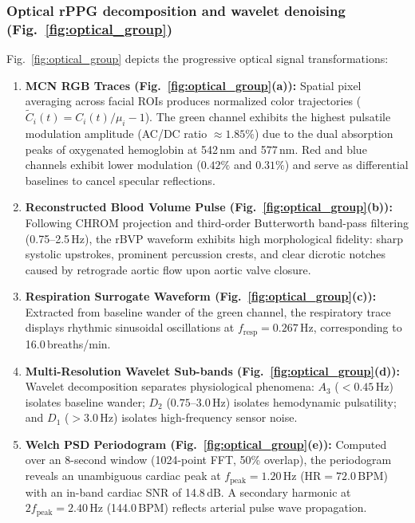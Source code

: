 \documentclass[journal]{IEEEtran}
\begin{document}
\subsubsection{Optical rPPG decomposition and wavelet denoising (Fig.~\ref{fig:optical_group})}
Fig.~\ref{fig:optical_group} depicts the progressive optical signal transformations:
\begin{enumerate}
  \item \textbf{MCN RGB Traces (Fig.~\ref{fig:optical_group}(a)):} Spatial pixel averaging across facial ROIs produces normalized color trajectories ($\tilde C_i(t) = C_i(t)/\mu_i - 1$). The green channel exhibits the highest pulsatile modulation amplitude (AC/DC ratio $\approx 1.85\%$) due to the dual absorption peaks of oxygenated hemoglobin at 542\,nm and 577\,nm. Red and blue channels exhibit lower modulation ($0.42\%$ and $0.31\%$) and serve as differential baselines to cancel specular reflections.
  \item \textbf{Reconstructed Blood Volume Pulse (Fig.~\ref{fig:optical_group}(b)):} Following CHROM projection and third-order Butterworth band-pass filtering (0.75--2.5\,Hz), the rBVP waveform exhibits high morphological fidelity: sharp systolic upstrokes, prominent percussion crests, and clear dicrotic notches caused by retrograde aortic flow upon aortic valve closure.
  \item \textbf{Respiration Surrogate Waveform (Fig.~\ref{fig:optical_group}(c)):} Extracted from baseline wander of the green channel, the respiratory trace displays rhythmic sinusoidal oscillations at $f_{\mathrm{resp}} = 0.267$\,Hz, corresponding to 16.0\,breaths/min.
  \item \textbf{Multi-Resolution Wavelet Sub-bands (Fig.~\ref{fig:optical_group}(d)):} Wavelet decomposition separates physiological phenomena: $A_3$ ($<0.45$\,Hz) isolates baseline wander; $D_2$ ($0.75$--$3.0$\,Hz) isolates hemodynamic pulsatility; and $D_1$ ($>3.0$\,Hz) isolates high-frequency sensor noise.
  \item \textbf{Welch PSD Periodogram (Fig.~\ref{fig:optical_group}(e)):} Computed over an 8-second window (1024-point FFT, 50\% overlap), the periodogram reveals an unambiguous cardiac peak at $f_{\mathrm{peak}} = 1.20$\,Hz ($\mathrm{HR} = 72.0$\,BPM) with an in-band cardiac SNR of 14.8\,dB. A secondary harmonic at $2 f_{\mathrm{peak}} = 2.40$\,Hz (144.0\,BPM) reflects arterial pulse wave propagation.
\end{enumerate}
\end{document}
